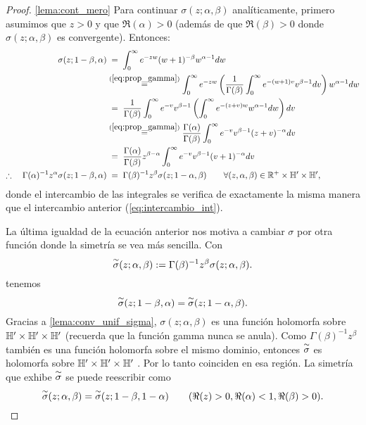 \begin{proof}\ref{lema:cont_mero}
  Para continuar $\sigma(z;\alpha,\beta)$ anal\'iticamente, primero asumimos que $z>0$ y que
$\Re(\alpha)>0$ (adem\'as de que $\Re(\beta)>0$ donde $\sigma(z;\alpha,\beta)$ es convergente).
Entonces:
\begin{align*}
  \sigma(z;1-\beta,\alpha)
  &\;=\;\int_0^{\infty}e^{-zw}(w+1)^{-\beta}w^{\alpha-1}dw\\
  &\overset{(\ref{eq:prop_gamma})}{=}
    \int_0^{\infty}
    e^{-zw}\left( \frac{1}{\Gamma(\beta)}\int_0^{\infty}e^{-(w+1)v}v^{\beta-1}dv \right)w^{\alpha-1}dw\\
  &\;=\;\frac{1}{\Gamma(\beta)}\int_0^{\infty}
    e^{-v}v^{\beta-1}\left( \int_0^{\infty}e^{-(z+v)w}w^{\alpha-1}dw \right)dv\\
  &\overset{(\ref{eq:prop_gamma})}{=}
    \frac{\Gamma(\alpha)}{\Gamma(\beta)}\int_0^{\infty}
    e^{-v}v^{\beta-1}(z+v)^{-\alpha}dv\\
  &\;=\;\frac{\Gamma(\alpha)}{\Gamma(\beta)}z^{\beta-\alpha}\int_0^{\infty}
    e^{-v}v^{\beta-1}(v+1)^{-\alpha}dv\\
  \therefore\quad \Gamma(\alpha)^{-1}z^{\alpha}\sigma(z;1-\beta,\alpha)
  &\;=\;\Gamma(\beta)^{-1}z^{\beta}\sigma(z;1-\alpha,\beta)
    \qquad\forall (z,\alpha,\beta)\in\mathbb{R}^+\times\mathbb{H}'\times\mathbb{H}',
\end{align*}
donde el intercambio de las integrales se verifica de exactamente la misma manera que el
intercambio anterior (\ref{eq:intercambio_int}).

La \'ultima igualdad de la ecuaci\'on anterior nos motiva a cambiar $\sigma$ por otra funci\'on
donde la simetr\'ia se vea m\'as sencilla. Con
\[
  \overset{\sim}{\sigma}(z;\alpha,\beta):=\Gamma(\beta)^{-1}z^{\beta}\sigma(z;\alpha,\beta).
\]
tenemos
\[
  \overset{\sim}{\sigma}(z;1-\beta,\alpha)=\overset{\sim}{\sigma}(z;1-\alpha,\beta).
\]
Gracias a \ref{lema:conv_unif_sigma}, $\sigma(z;\alpha,\beta)$ es una funci\'on
holomorfa sobre $\mathbb{H}'\times\mathbb{H}'\times\mathbb{H}'$ (recuerda que la funci\'on gamma nunca se anula).
Como $\Gamma(\beta)^{-1}z^{\beta}$ tambi\'en es una funci\'on holomorfa sobre el mismo dominio,
entonces $\overset{\sim}{\sigma}$ es holomorfa sobre $\mathbb{H}'\times\mathbb{H}'\times\mathbb{H}'$ . Por lo tanto coinciden en
esa regi\'on. La simetr\'ia que exhibe $\overset{\sim}{\sigma}$ se puede reescribir como
\begin{equation}\label{eq:sim_st}
  \overset{\sim}{\sigma}(z;\alpha,\beta)=\overset{\sim}{\sigma}(z;1-\beta,1-\alpha)\qquad (\Re(z)>0,\Re(\alpha)<1,\Re(\beta)>0).
\end{equation}


\end{proof}
